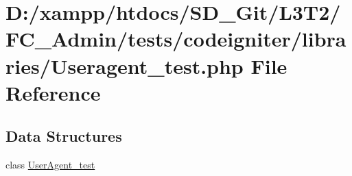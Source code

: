 \hypertarget{_admin_2tests_2codeigniter_2libraries_2_useragent__test_8php}{}\section{D\+:/xampp/htdocs/\+S\+D\+\_\+\+Git/\+L3\+T2/\+F\+C\+\_\+\+Admin/tests/codeigniter/libraries/\+Useragent\+\_\+test.php File Reference}
\label{_admin_2tests_2codeigniter_2libraries_2_useragent__test_8php}
\subsection*{Data Structures}
\begin{DoxyCompactItemize}
\item 
class \hyperlink{class_user_agent__test}{User\+Agent\+\_\+test}
\end{DoxyCompactItemize}
